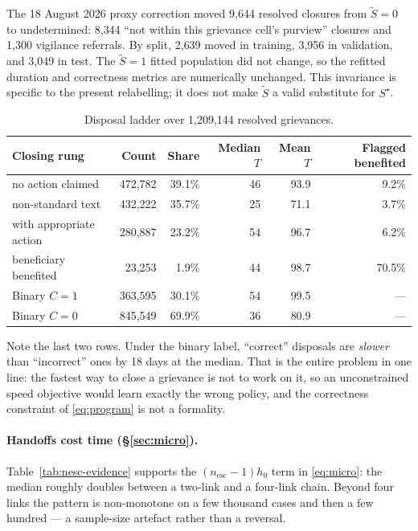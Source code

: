 \documentclass[11pt,a4paper]{article}
\theoremstyle{plain}
\theoremstyle{definition}
\theoremstyle{remark}
\newcommand{\Sstar}{S^{\star}}
\newcommand{\Sproxy}{\widetilde S}
\begin{document}
The 18 August 2026 proxy correction moved 9{,}644 resolved closures from $\Sproxy=0$ to
undetermined: 8{,}344 ``not within this grievance cell's purview'' closures and 1{,}300
vigilance referrals. By split, 2{,}639 moved in training, 3{,}956 in validation, and 3{,}049 in
test. The $\Sproxy=1$ fitted population did not change, so the refitted duration and correctness
metrics are numerically unchanged. This invariance is specific to the present relabelling; it
does not make $\Sproxy$ a valid substitute for $\Sstar$.

\begin{table}[h]
\centering
\caption{Disposal ladder over 1,209,144 resolved grievances.}
\label{tab:ladder-evidence}
\begin{tabular}{lrrrrr}
\toprule
Closing rung & Count & Share & Median $T$ & Mean $T$ & Flagged benefited\\
\midrule
no action claimed & 472,782 & 39.1\% & 46 & 93.9 & 9.2\%\\
non-standard text & 432,222 & 35.7\% & 25 & 71.1 & 3.7\%\\
with appropriate action & 280,887 & 23.2\% & 54 & 96.7 & 6.2\%\\
beneficiary benefited & 23,253 & 1.9\% & 44 & 98.7 & 70.5\%\\
\midrule
Binary $C=1$ & 363,595 & 30.1\% & 54 & 99.5 & ---\\
Binary $C=0$ & 845,549 & 69.9\% & 36 & 80.9 & ---\\
\bottomrule
\end{tabular}
\end{table}

Note the last two rows. Under the binary label, ``correct'' disposals are \emph{slower} than
``incorrect'' ones by 18 days at the median. That is the entire problem in one line: the fastest
way to close a grievance is not to work on it, so an unconstrained speed objective would learn
exactly the wrong policy, and the correctness constraint of \eqref{eq:program} is not a
formality.

\paragraph{Handoffs cost time (\S\ref{sec:micro}).} Table~\ref{tab:nesc-evidence} supports the
$(n_{\text{esc}}-1)h_0$ term in \eqref{eq:micro}: the median roughly doubles between a two-link
and a four-link chain. Beyond four links the pattern is non-monotone on a few thousand cases and
then a few hundred --- a sample-size artefact rather than a reversal.
\end{document}
